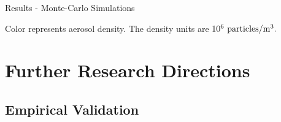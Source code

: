 \documentclass[compress,red,12pt]{beamer}
\begin{document}

\begin{frame}{Results - Monte-Carlo Simulations}
  \centerline{\def\svgwidth{1.15\linewidth}\footnotesize{}}
  \centerline{\footnotesize Color represents aerosol density. The
    density units are $10^{6}~{\rm particles}/{\rm m}^3.$}
\end{frame}


\section{Further Research Directions}


\subsection{Empirical Validation}
\end{document}
